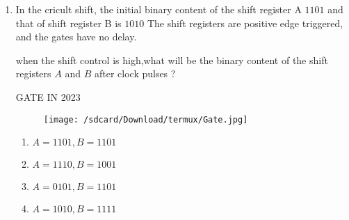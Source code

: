 \documentclass[20pt,-letter paper]{article}
\title{}
\date{\today}
\begin{document}

\begin{enumerate}

\item In the cricult shift, the initial binary content of the shift register A $1101$ and that of shift register B is $1010$ The shift registers are positive edge triggered, and the gates have no delay.

when the shift control is high,what will be the binary content of the shift registers $A$ and $B$ after clock pulses ?


\hfill{GATE IN 2023}

\begin {figure}[h]
 \centering
 \texttt{[image: /sdcard/Download/termux/Gate.jpg]}
\end{figure}

\begin{enumerate}
\item $A= 1101,B=1101$
\item $A=1110 ,B=1001$
\item $A=0101 ,B=1101$
\item $A=1010 ,B=1111$
\end {enumerate}
\end {enumerate}
\end{document}
